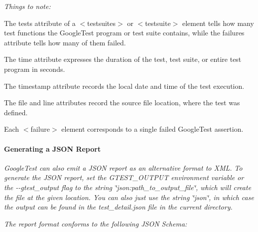 {\itshape Things to note\+:}

{\itshape 
\begin{DoxyItemize}
\item The {\ttfamily tests} attribute of a {\ttfamily $<$testsuites$>$} or {\ttfamily $<$testsuite$>$} element tells how many test functions the Google\+Test program or test suite contains, while the {\ttfamily failures} attribute tells how many of them failed.
\item The {\ttfamily time} attribute expresses the duration of the test, test suite, or entire test program in seconds.
\item The {\ttfamily timestamp} attribute records the local date and time of the test execution.
\item The {\ttfamily file} and {\ttfamily line} attributes record the source file location, where the test was defined.
\item Each {\ttfamily $<$failure$>$} element corresponds to a single failed Google\+Test assertion.
\end{DoxyItemize}}

{\itshape \paragraph*{Generating a J\+S\+ON Report}}

{\itshape }

{\itshape Google\+Test can also emit a J\+S\+ON report as an alternative format to X\+ML. To generate the J\+S\+ON report, set the {\ttfamily G\+T\+E\+S\+T\+\_\+\+O\+U\+T\+P\+UT} environment variable or the {\ttfamily -\/-\/gtest\+\_\+output} flag to the string {\ttfamily \char`\"{}json\+:path\+\_\+to\+\_\+output\+\_\+file\char`\"{}}, which will create the file at the given location. You can also just use the string {\ttfamily \char`\"{}json\char`\"{}}, in which case the output can be found in the {\ttfamily test\+\_\+detail.\+json} file in the current directory.}

{\itshape The report format conforms to the following J\+S\+ON Schema\+:}

